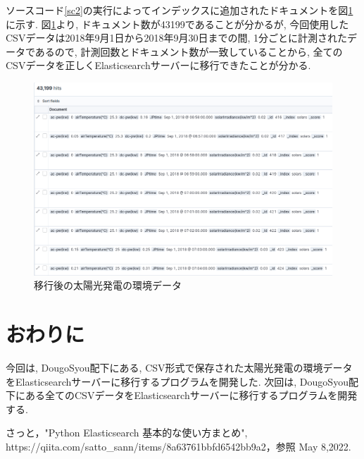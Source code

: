 \documentclass[a4j,12pt,]{jarticle}
\begin{document}
ソースコード\ref{sc2}の実行によってインデックスに追加されたドキュメントを図\ref{p2}に示す.
図\ref{p2}より, ドキュメント数が43199であることが分かるが, 今回使用したCSVデータは2018年9月1日から2018年9月30日までの間, 1分ごとに計測されたデータであるので, 計測回数とドキュメント数が一致していることから, 全てのCSVデータを正しくElasticsearchサーバーに移行できたことが分かる.

\begin{figure}[H]
  \begin{center}
    \includegraphics[width=160mm]{kibana.png}
    \caption{移行後の太陽光発電の環境データ}
    \label{p2}
  \end{center}
\end{figure}

\section{おわりに}
今回は, DougoSyou配下にある, CSV形式で保存された太陽光発電の環境データをElasticsearchサーバーに移行するプログラムを開発した.
次回は, DougoSyou配下にある全てのCSVデータをElasticsearchサーバーに移行するプログラムを開発する.

\begin{thebibliography}{5}
  さっと，"Python Elasticsearch 基本的な使い方まとめ",\\ https://qiita.com/satto\_sann/items/8a63761bbfd6542bb9a2，参照 May 8,2022.
\end{thebibliography}
\end{document}
